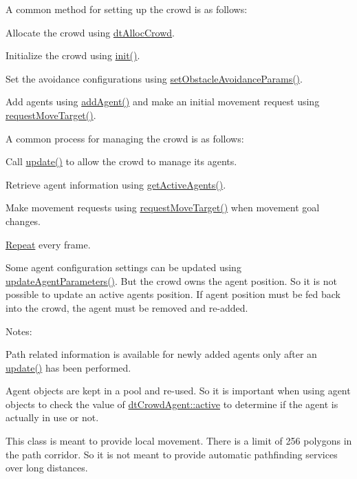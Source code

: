 A common method for setting up the crowd is as follows\+:


\begin{DoxyEnumerate}
\item Allocate the crowd using \hyperlink{group__crowd_ga01a53c9d76d1b61678ab1944dfbfac55}{dt\+Alloc\+Crowd}.
\item Initialize the crowd using \hyperlink{classdtCrowd_a2f670cde9e10d07e3ed189ea861f37e4}{init()}.
\item Set the avoidance configurations using \hyperlink{classdtCrowd_a96338b9a99e8d58a3051a9ce7934e8b1}{set\+Obstacle\+Avoidance\+Params()}.
\item Add agents using \hyperlink{classdtCrowd_ae8c89febfd979a6b963c62d8cdb60653}{add\+Agent()} and make an initial movement request using \hyperlink{classdtCrowd_aa30c34a65535118989ccd86542e96797}{request\+Move\+Target()}.
\end{DoxyEnumerate}

A common process for managing the crowd is as follows\+:


\begin{DoxyEnumerate}
\item Call \hyperlink{classdtCrowd_ae3f041e335ca87c323e7340e73113919}{update()} to allow the crowd to manage its agents.
\item Retrieve agent information using \hyperlink{classdtCrowd_a15a4b9b9fb72a358514489ea8f755405}{get\+Active\+Agents()}.
\item Make movement requests using \hyperlink{classdtCrowd_aa30c34a65535118989ccd86542e96797}{request\+Move\+Target()} when movement goal changes.
\item \hyperlink{classRepeat}{Repeat} every frame.
\end{DoxyEnumerate}

Some agent configuration settings can be updated using \hyperlink{classdtCrowd_a6ed4aa0026c21593daa9ea12c71f84c2}{update\+Agent\+Parameters()}. But the crowd owns the agent position. So it is not possible to update an active agent\textquotesingle{}s position. If agent position must be fed back into the crowd, the agent must be removed and re-\/added.

Notes\+:


\begin{DoxyItemize}
\item Path related information is available for newly added agents only after an \hyperlink{classdtCrowd_ae3f041e335ca87c323e7340e73113919}{update()} has been performed.
\item Agent objects are kept in a pool and re-\/used. So it is important when using agent objects to check the value of \hyperlink{structdtCrowdAgent_a6473f48354abf6f46f5b4d7ead9bca20}{dt\+Crowd\+Agent\+::active} to determine if the agent is actually in use or not.
\item This class is meant to provide \textquotesingle{}local\textquotesingle{} movement. There is a limit of 256 polygons in the path corridor. So it is not meant to provide automatic pathfinding services over long distances.
\end{DoxyItemize}

